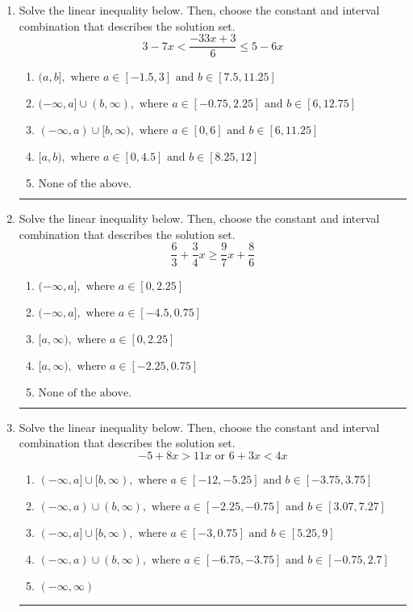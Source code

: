 \documentclass[14pt]{extbook}
\newcommand{\litem}[1]{\item#1\hspace*{-1cm}\rule{\textwidth}{0.4pt}}
\begin{document}
\begin{enumerate}
{\begin{enumerate}[label=\Alph*.]
\end{enumerate} }
\litem{
Solve the linear inequality below. Then, choose the constant and interval combination that describes the solution set.\[ 3 - 7 x < \frac{-33 x + 3}{6} \leq 5 - 6 x \]\begin{enumerate}[label=\Alph*.]
\item \( (a, b], \text{ where } a \in [-1.5, 3] \text{ and } b \in [7.5, 11.25] \)
\item \( (-\infty, a] \cup (b, \infty), \text{ where } a \in [-0.75, 2.25] \text{ and } b \in [6, 12.75] \)
\item \( (-\infty, a) \cup [b, \infty), \text{ where } a \in [0, 6] \text{ and } b \in [6, 11.25] \)
\item \( [a, b), \text{ where } a \in [0, 4.5] \text{ and } b \in [8.25, 12] \)
\item \( \text{None of the above.} \)

\end{enumerate} }
\litem{
Solve the linear inequality below. Then, choose the constant and interval combination that describes the solution set.\[ \frac{6}{3} + \frac{3}{4} x \geq \frac{9}{7} x + \frac{8}{6} \]\begin{enumerate}[label=\Alph*.]
\item \( (-\infty, a], \text{ where } a \in [0, 2.25] \)
\item \( (-\infty, a], \text{ where } a \in [-4.5, 0.75] \)
\item \( [a, \infty), \text{ where } a \in [0, 2.25] \)
\item \( [a, \infty), \text{ where } a \in [-2.25, 0.75] \)
\item \( \text{None of the above}. \)

\end{enumerate} }
\litem{
Solve the linear inequality below. Then, choose the constant and interval combination that describes the solution set.\[ -5 + 8 x > 11 x \text{ or } 6 + 3 x < 4 x \]\begin{enumerate}[label=\Alph*.]
\item \( (-\infty, a] \cup [b, \infty), \text{ where } a \in [-12, -5.25] \text{ and } b \in [-3.75, 3.75] \)
\item \( (-\infty, a) \cup (b, \infty), \text{ where } a \in [-2.25, -0.75] \text{ and } b \in [3.07, 7.27] \)
\item \( (-\infty, a] \cup [b, \infty), \text{ where } a \in [-3, 0.75] \text{ and } b \in [5.25, 9] \)
\item \( (-\infty, a) \cup (b, \infty), \text{ where } a \in [-6.75, -3.75] \text{ and } b \in [-0.75, 2.7] \)
\item \( (-\infty, \infty) \)


\end{enumerate}}
\end{enumerate}
\end{document}
